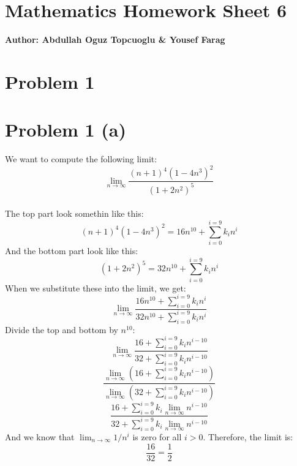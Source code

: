 \documentclass{article}
\begin{document}
\section*{\huge Mathematics Homework Sheet 6}
\begin{flushright}
   \textbf{Author: Abdullah Oguz Topcuoglu \& Yousef Farag}
\end{flushright}

\section*{Problem 1}
\section*{Problem 1 (a)}
We want to compute the following limit:
\[
   \lim_{n \rightarrow \infty} \frac{(n+1)^4(1 - 4n^3)^2}{(1+2n^2)^5}
\]
\\
The top part look somethin like this:
\[
   (n+1)^4(1 - 4n^3)^2 = 16n^{10} + \sum_{i = 0}^{i = 9} k_in^i
\]
And the bottom part look like this:
\[
   (1+2n^2)^5 = 32n^{10} + \sum_{i = 0}^{i = 9} k_in^i
\]
When we substitute these into the limit, we get:
\[
   \lim_{n \rightarrow \infty} \frac{16n^{10} + \sum_{i = 0}^{i = 9} k_in^i}{32n^{10} + \sum_{i = 0}^{i = 9} k_in^i}
\]
Divide the top and bottom by $n^{10}$:
\[
   \lim_{n \rightarrow \infty} \frac{16 + \sum_{i = 0}^{i = 9} k_in^{i-10}}{32 + \sum_{i = 0}^{i = 9} k_in^{i-10}}
\]
\[
   \frac{\lim_{n \rightarrow \infty}(16 + \sum_{i = 0}^{i = 9} k_in^{i-10})}{\lim_{n \rightarrow \infty}(32 + \sum_{i = 0}^{i = 9} k_in^{i-10})}
\]
\[
   \frac{16 + \sum_{i = 0}^{i = 9} k_i\lim_{n \rightarrow \infty}n^{i-10}}{32 + \sum_{i = 0}^{i = 9} k_i\lim_{n \rightarrow \infty}n^{i-10}}
\]
And we know that \(\lim_{n \rightarrow \infty} 1/n^i\) is zero for all \(i > 0\). Therefore, the limit is:
\[
   \frac{16}{32} = \frac{1}{2}
\]
\end{document}
